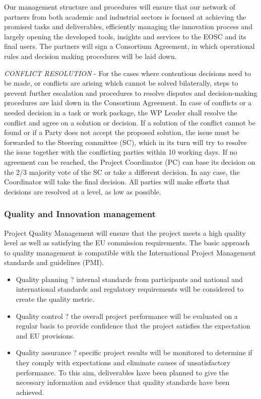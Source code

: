 Our management structure and procedures will ensure that our network
of partners from both academic and industrial sectors is focused at
achieving the promised tasks and deliverables, efficiently managing
the innovation process and largely opening the developed tools,
insights and services to the EOSC and its final users.
The partners will sign a Consortium Agreement, in which operational
rules and decision making procedures will be laid down.

\emph{CONFLICT RESOLUTION} - For the cases where contentious decisions
need to be made, or conflicts are arising which cannot be solved bilaterally,
steps to prevent further escalation and procedures to resolve disputes
and decision-making procedures are laid down in the Consortium Agreement.
In case of conflicts or a needed decision in a task or work package,
the WP Leader shall resolve the conflict and agree on a solution or decision.
If a solution of the conflict cannot be found or if a Party does not accept
the proposed solution, the issue must be forwarded to the Steering committee (SC),
which in its turn will try to resolve the issue together with the conflicting parties
within 10 working days. If no agreement can be reached, the Project Coordinator (PC) can
base its decision on the 2/3 majority vote of the SC or take a different decision.
In any case, the Coordinator will take the final decision. All parties will make
efforts that decisions are resolved at a level, as low as possible.

\subsubsection{Quality and Innovation management}

\TheProject Project Quality Management will ensure that
the project meets a high quality level as well as satisfying the EU commission
requirements. The basic approach to quality management is compatible with the
International Project Management standards and guidelines (PMI).

\begin{itemize}
\item Quality planning ? internal standards from participants and national and international standards and
regulatory requirements will be considered to create the quality metric.
\item Quality control ? the overall project performance will be evaluated on a regular basis to provide
confidence that the project satisfies the expectation and EU provisions.
\item Quality assurance ? specific project results will be monitored to determine if they comply with
expectations and eliminate causes of unsatisfactory performance. To this aim, deliverables have been
planned to give the necessary information and evidence that quality standards have been achieved.
\end{itemize}

